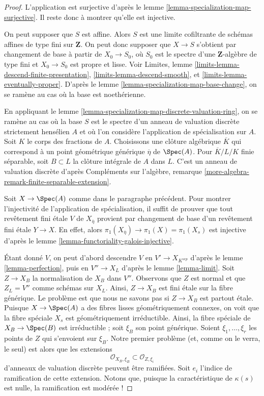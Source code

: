 \begin{proof}
L'application est surjective d'après le
lemme \ref{lemma-specialization-map-surjective}.
Il reste donc à montrer qu'elle est injective.

\medskip\noindent
On peut supposer que $S$ est affine. Alors $S$ est une limite cofiltrante de schémas
affines de type fini sur $\mathbf{Z}$.
On peut donc supposer que $X \to S$ s'obtient par
changement de base à partir de $X_0 \to S_0$, où $S_0$ est le spectre d'une
$\mathbf{Z}$-algèbre de type fini et $X_0 \to S_0$ est propre et lisse.
Voir Limites, lemme \ref{limits-lemma-descend-finite-presentation},
\ref{limits-lemma-descend-smooth}, et
\ref{limits-lemma-eventually-proper}. D'après le
lemme \ref{lemma-specialization-map-base-change},
on se ramène au cas où la base est noethérienne.

\medskip\noindent
En appliquant le lemme \ref{lemma-specialization-map-discrete-valuation-ring},
on se ramène au cas où la base $S$ est le spectre d'un
anneau de valuation discrète strictement hensélien $A$ et où l'on
considère l'application de spécialisation sur $A$.
Soit $K$ le corps des fractions de $A$.
Choisissons une clôture algébrique $\overline{K}$ qui
correspond à un point géométrique générique $\overline{\eta}$ de $\Spec(A)$.
Pour $\overline{K}/L/K$ finie séparable, soit $B \subset L$ la
clôture intégrale de $A$ dans $L$. C'est un anneau de
valuation discrète d'après
Compléments sur l'algèbre, remarque \ref{more-algebra-remark-finite-separable-extension}.

\medskip\noindent
Soit $X \to \Spec(A)$ comme dans le paragraphe précédent.
Pour montrer l'injectivité de l'application de spécialisation,
il suffit de prouver que tout revêtement fini
\'etale $V$ de $X_{\overline{\eta}}$ provient par changement
de base d'un revêtement fini \'etale $Y \to X$.
En effet, alors $\pi_1(X_{\overline{\eta}}) \to \pi_1(X) = \pi_1(X_s)$
est injective d'après le lemme \ref{lemma-functoriality-galois-injective}.

\medskip\noindent
Étant donné $V$, on peut d'abord descendre $V$ en $V' \to X_{K^{sep}}$ d'après le
lemme \ref{lemma-perfection}, puis en
$V'' \to X_L$ d'après le lemme \ref{lemma-limit}.
Soit $Z \to X_B$ la normalisation de $X_B$ dans $V''$.
Observons que $Z$ est normal et que $Z_L = V''$ comme schémas
sur $X_L$. Ainsi, $Z \to X_B$ est fini \'etale sur
la fibre générique. Le problème est que nous ne savons pas si
$Z \to X_B$ est partout \'etale. Puisque $X \to \Spec(A)$
a des fibres lisses géométriquement connexes, on voit que
la fibre spéciale $X_s$ est géométriquement irréductible.
Ainsi, la fibre spéciale de $X_B \to \Spec(B)$ est irréductible ;
soit $\xi_B$ son point générique. Soient
$\xi_1, \ldots, \xi_r$ les points de $Z$ qui s'envoient sur
$\xi_B$. Notre premier problème (et, comme on le verra, le seul)
est alors que les extensions
$$
\mathcal{O}_{X_B, \xi_B} \subset \mathcal{O}_{Z, \xi_i}
$$
d'anneaux de valuation discrète peuvent être ramifiées. Soit $e_i$
l'indice de ramification de cette extension. Notons que, puisque la
caractéristique de $\kappa(s)$ est nulle, la ramification est modérée !


\end{proof}
